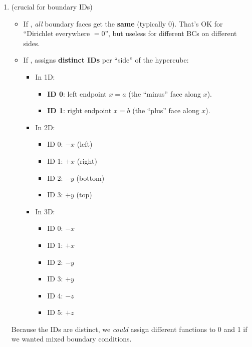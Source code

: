 \begin{enumerate}
\begin{enumerate}
        \item {} (crucial for boundary IDs)
        \begin{itemize}
            \item If , \emph{all} boundary faces get the \textbf{same}  (typically 0). That's OK for ``Dirichlet everywhere $= 0$'', but useless for different BCs on different sides.
            \item If ,  assigns \textbf{distinct IDs} per ``side'' of the hypercube:
            \begin{itemize}
                \item In 1D:
                \begin{itemize}
                    \item \textbf{ID 0}: left endpoint $x=a$ (the ``minus'' face along $x$).
                    \item \textbf{ID 1}: right endpoint $x=b$ (the ``plus'' face along $x$).
                \end{itemize}
                \item In 2D:
                \begin{itemize}
                    \item ID 0: $-x$ (left)
                    \item ID 1: $+x$ (right)
                    \item ID 2: $-y$ (bottom)
                    \item ID 3: $+y$ (top)
                \end{itemize}
                \item In 3D:
                \begin{itemize}
                    \item ID 0: $-x$
                    \item ID 1: $+x$
                    \item ID 2: $-y$
                    \item ID 3: $+y$
                    \item ID 4: $-z$
                    \item ID 5: $+z$
                \end{itemize}
            \end{itemize}
        \end{itemize}
        Because the IDs are distinct, we \emph{could} assign different functions to 0 and 1 if we wanted mixed boundary conditions.


\end{enumerate}
\end{enumerate}
